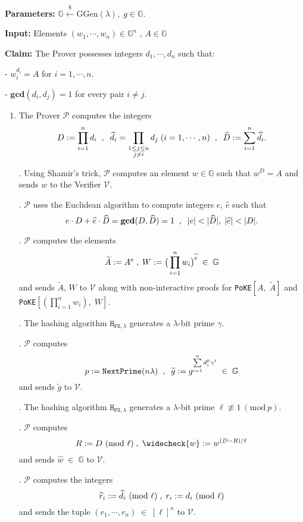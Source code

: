 \documentclass[11pt, lettersize, notitlepage, leqno, footskip=0.6cm]{article}
\newcommand{\pl}{\prod\limits}
\newcommand{\slim}{\sum\limits}
\newcommand{\ttt}{\texttt}
\newcommand{\bG}{\mathbb{G}}
\newcommand{\wti}{\widetilde}
\newcommand{\mc}{\mathcal}
\newcommand{\mb}{\mathbb}
\newcommand{\mbf}{\mathbf}
\newcommand{\mr}{\mathrm}
\newcommand{\lam}{\lambda}
\newcommand{\lamb}{\lambda}
\newcommand{\what}{\widehat}
\newcommand{\weck}{\widecheck}
\newcommand{\mP}{\mc{P}}
\newcommand{\V}{\mc{V}}
\newcommand{\vs}{\vspace{-0.15cm}}
\newcommand{\noin}{\noindent}
\newcommand{\Mod}[1]{\ (\mathrm{mod}\ #1)}
\newcommand{\GCD}{\mbf{gcd}}
\numberwithin{equation}{section}
\begin{document}
\noin \textbf{Parameters:} $\mb{G}\xleftarrow{\$} \mr{GGen}(\lamb), \; g\in \mb{G}$.

\noin \textbf{Input:} Elements $(w_1,\cdots, w_n)\in \mb{G}^n$ , $A\in\mb{G}$

\noin \textbf{Claim:} The Prover possesses integers $ d_1,\cdots, d_n$ such that:

\noin - $w_i^{d_i} = A$ for $i = 1,\cdots,n$.

\noin - $\GCD(d_i, d_j) = 1$ for every pair $i\neq j$.

\begin{enumerate}[wide, labelwidth=!, labelindent=0pt]\vspace{-0.2cm} \item The Prover $\mc{P}$ computes the integers \vs $$D := \prod\limits_{i=1}^n d_i\;\;,\;\;\what{d}_i = \pl_{\substack{1\leq j\leq n\\ j\neq i}} d_j\;(i=1,\cdots,n)\;\;,\;\; \what{D}:=\slim_{i=1}^n\what{d}_i. \vspace{-0.2cm} $$

\noin 2. Using Shamir's trick, $\mc{P}$ computes an element $w\in\mb{G}$ such that $w^D = A$ and sends $w$ to the Verifier $\mc{V}$.

\noin 3. $\mP$ uses the Euclidean algorithm to compute integers $e$, $\what{e}$ such that \vs $$e\cdot D+\what{e}\cdot \what{D} = \GCD(D,\what{D}) = 1\;\;,\;\;|e|< |\what{D}|,\;|\what{e}|< |{D}|.\vs $$

\noin 4. $\mP$ computes the elements \vspace{-0.3cm} $$\wti{A}:= A^{e}\;,\;W := \big(\pl_{i=1}^n w_i\big)^{\what{e}}\;\in\;\bG\vs $$ and sends $\wti{A}$, $W$ to $\V$ along with non-interactive proofs for \verb|PoKE|$[A,\; \wti{A}]$ and \verb|PoKE|$[(\prod_{i=1}^n w_i),\; W]$.

\noin 5. The hashing algorithm $\ttt{H}_{\ttt{FS},\lam}$ generates a $\lam$-bit prime $\gamma$.

\noin 6. $\mc{P}$ computes \vs $$p:= \ttt{NextPrime}(n\lam)\;\;,\;\;\wti{g} := g^{\slim_{i=1}^n d_i^{p}\gamma^i}\;\in\;\bG\vs $$ and sends $\wti{g}$ to $\mc{V}$.

\noin 7. The hashing algorithm $\ttt{H}_{\ttt{FS},\lam}$ generates a $\lam$-bit prime $\ell\not\equiv 1\Mod{p}$.

\noin 8. $\mc{P}$ computes \vs $$R:= D\Mod{\ell}\;,\; \weck{w}:= w^{(D-R)/\ell}\vs $$ and sends $\what{w}\;\in\;\bG$ to $\mc{V}$.

\noin 9. $\mc{P}$ computes the integers \vs $$\what{r}_i:= \what{d}_i\Mod{\ell}\;,\;{r}_i:= {d}_i\Mod{\ell}\vs $$ and sends the tuple $(r_1,\cdots,r_n)\;\in\;[\ell]^n$ to $\mc{V}$.


\end{enumerate}
\end{document}
